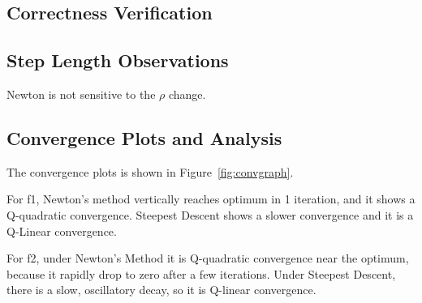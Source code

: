 \documentclass[12pt]{article}
\begin{document}
\subsection{Correctness Verification}

\subsection{Step Length Observations}


Newton is not sensitive to the $\rho$ change.  %

\subsection{Convergence Plots and Analysis}

The convergence plots is shown in Figure~\ref{fig:convgraph}. 

For f1, Newton's method vertically reaches optimum in 1 iteration, and it shows a Q-quadratic convergence. Steepest Descent  shows a slower convergence and it is a Q-Linear convergence.

For f2, under Newton’s Method it is Q-quadratic convergence near the optimum, because it rapidly drop to zero after a few iterations. Under Steepest Descent, there is a slow, oscillatory decay, so it is Q-linear convergence.
\end{document}
